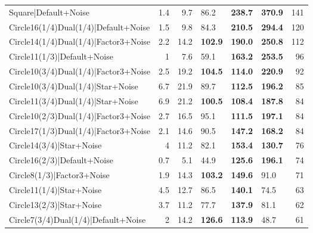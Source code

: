 \begin{tabular}{lrrlllr}
 Square|Default+Noise                 &          1.4 &            9.7 & 86.2           & \textbf{238.7} & \textbf{370.9} &          141 \\
 Circle16(1/4)Dual(1/4)|Default+Noise &          1.5 &            9.8 & 84.3           & \textbf{210.5} & \textbf{294.4} &          120 \\
 Circle14(1/4)Dual(1/4)|Factor3+Noise &          2.2 &           14.2 & \textbf{102.9} & \textbf{190.0} & \textbf{250.8} &          112 \\
 Circle11(1/3)|Default+Noise          &          1   &            7.6 & 59.1           & \textbf{163.2} & \textbf{253.5} &           96 \\
 Circle10(3/4)Dual(1/4)|Factor3+Noise &          2.5 &           19.2 & \textbf{104.5} & \textbf{114.0} & \textbf{220.9} &           92 \\
 Circle10(3/4)Dual(1/4)|Star+Noise    &          6.7 &           21.9 & 89.7           & \textbf{112.5} & \textbf{196.2} &           85 \\
 Circle11(3/4)Dual(1/4)|Star+Noise    &          6.9 &           21.2 & \textbf{100.5} & \textbf{108.4} & \textbf{187.8} &           84 \\
 Circle10(2/3)Dual(1/4)|Factor3+Noise &          2.7 &           16.5 & 95.1           & \textbf{111.5} & \textbf{197.1} &           84 \\
 Circle17(1/3)Dual(1/4)|Factor3+Noise &          2.1 &           14.6 & 90.5           & \textbf{147.2} & \textbf{168.2} &           84 \\
 Circle14(3/4)|Star+Noise             &          4   &           11.2 & 82.1           & \textbf{153.4} & \textbf{130.7} &           76 \\
 Circle16(2/3)|Default+Noise          &          0.7 &            5.1 & 44.9           & \textbf{125.6} & \textbf{196.1} &           74 \\
 Circle8(1/3)|Factor3+Noise           &          1.9 &           14.3 & \textbf{103.2} & \textbf{149.6} & 91.0           &           71 \\
 Circle11(1/4)|Star+Noise             &          4.5 &           12.7 & 86.5           & \textbf{140.1} & 74.5           &           63 \\
 Circle13(2/3)|Star+Noise             &          3.7 &           11.2 & 77.7           & \textbf{137.9} & 81.1           &           62 \\
 Circle7(3/4)Dual(1/4)|Default+Noise  &          2   &           14.2 & \textbf{126.6} & \textbf{113.9} & 48.7           &           61 \\

\end{tabular}

